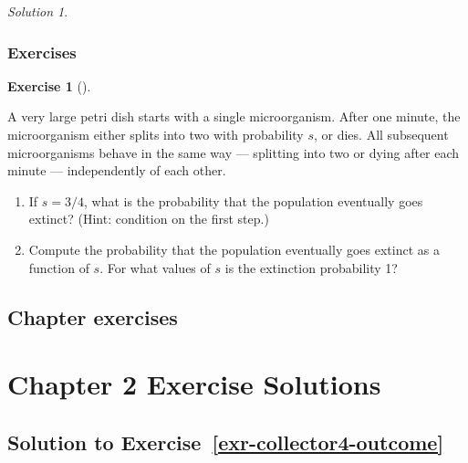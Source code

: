 \documentclass[
  letterpaper,
  DIV=11,
  numbers=noendperiod]{scrreprt}
\providecommand{\tightlist}{%
  \setlength{\itemsep}{0pt}\setlength{\parskip}{0pt}}
\theoremstyle{plain}
\theoremstyle{definition}
\theoremstyle{definition}
\newtheorem{exercise}{Exercise}[chapter]
\theoremstyle{definition}
\theoremstyle{remark}
\newtheorem{refsolution}{Solution}[chapter]
\begin{document}
\begin{tcolorbox}
\begin{refsolution}
\label{sol-counting-lottery}

\end{refsolution}

\end{tcolorbox}

\subsection{Exercises}\label{exercises-15}

\begin{exercise}[]\protect\hypertarget{exr-branching-extinction}{}\label{exr-branching-extinction}

A very large petri dish starts with a single microorganism. After one
minute, the microorganism either splits into two with probability \(s\),
or dies. All subsequent microorganisms behave in the same way ---
splitting into two or dying after each minute --- independently of each
other.

\begin{enumerate}
\def\labelenumi{\arabic{enumi}.}
\tightlist
\item
  If \(s=3/4\), what is the probability that the population eventually
  goes extinct? (Hint: condition on the first step.)
\item
  Compute the probability that the population eventually goes extinct as
  a function of \(s\). For what values of \(s\) is the extinction
  probability 1?
\end{enumerate}

\end{exercise}

\section{Chapter exercises}\label{chapter-exercises-1}


\chapter{Chapter 2 Exercise
Solutions}\label{chapter-2-exercise-solutions}

\section{\texorpdfstring{Solution to
Exercise~\ref{exr-collector4-outcome}}{Solution to Exercise~}}\label{solution-to-exr-collector4-outcome}
\end{document}
